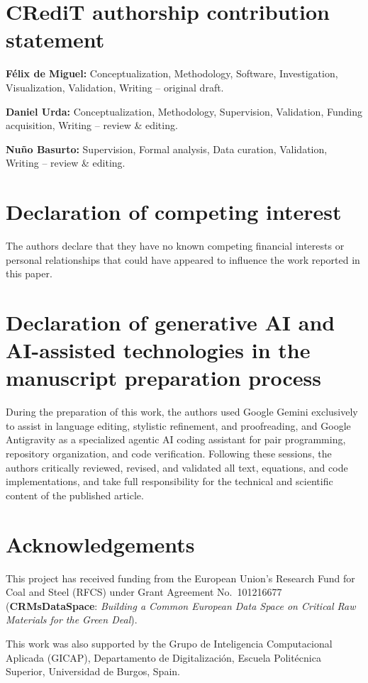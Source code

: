 \section*{CRediT authorship contribution statement}
\label{sec:CRediTAuthorshipContributionStatement}

\textbf{F{\'e}lix de Miguel:} Conceptualization, Methodology, Software, Investigation, Visualization, Validation, Writing -- original draft.

\textbf{Daniel Urda:} Conceptualization, Methodology, Supervision, Validation, Funding acquisition, Writing -- review \& editing.

\textbf{Nu{\~n}o Basurto:} Supervision, Formal analysis, Data curation, Validation, Writing -- review \& editing.

\section*{Declaration of competing interest}
\label{sec:DeclarationOfCompetingInterest}

The authors declare that they have no known competing financial interests or personal relationships that could have appeared to influence the work reported in this paper.

\section*{Declaration of generative AI and AI-assisted technologies in the manuscript preparation process}
\label{sec:DeclarationGenerativeAI}

During the preparation of this work, the authors used Google Gemini exclusively to assist in language editing, stylistic refinement, and proofreading, and Google Antigravity as a specialized agentic AI coding assistant for pair programming, repository organization, and code verification. Following these sessions, the authors critically reviewed, revised, and validated all text, equations, and code implementations, and take full responsibility for the technical and scientific content of the published article.

\section*{Acknowledgements}
\label{sec:Acknowledgements}

This project has received funding from the European Union's Research Fund for Coal and Steel (RFCS) under Grant Agreement No.~101216677 (\textbf{CRMsDataSpace}: \textit{Building a Common European Data Space on Critical Raw Materials for the Green Deal}).

This work was also supported by the Grupo de Inteligencia Computacional Aplicada (GICAP), Departamento de Digitalizaci{\'o}n, Escuela Polit{\'e}cnica Superior, Universidad de Burgos, Spain.
